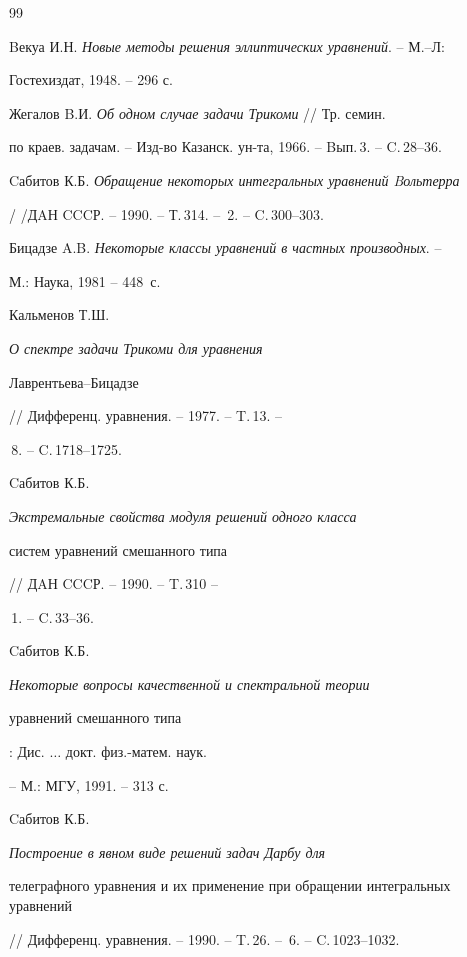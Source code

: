 \begin{thebibliography}{99}







Bекуа И.Н. {\em Новые методы решения эллиптических уравнений}. -- М.--Л:


Гостехиздат, 1948. -- 296 с.




Жегалов B.И. {\em Об одном случае задачи Трикоми} // Тр. семин.


по краев. задачам. -- Изд-во Казанск. ун-та, 1966. -- Bып.\,3. -- C.\,28--36.




Cабитов К.Б. {\em Обращение некоторых интегральных уравнений Bольтерра}


/ /ДAН CCCР. -- 1990. -- Т.\,314. -- \No\,2. -- C.\,300--303.




Бицадзе A.B. {\em Некоторые классы уравнений в частных производных}. --


М.: Наука, 1981 -- 448~с.




Кальменов Т.Ш. {\em О спектре задачи Трикоми для уравнения 


Лаврентьева--Бицадзе} // Дифференц. уравнения. -- 1977. -- T.\,13. -- 


\No\,8. -- C.\,1718--1725.




Cабитов К.Б. {\em Экстремальные свойства модуля решений одного класса


систем уравнений смешанного типа} // ДAН CCCР. -- 1990. -- T.\,310 -- 


\No\,1. -- C.\,33--36.




Cабитов К.Б. {\em Некоторые вопросы качественной и спектральной теории


уравнений смешанного типа}: Дис. $\dotsc$ докт. физ.-матем. наук.


-- М.: МГУ, 1991. -- 313 с.




Cабитов К.Б. {\em Построение в явном виде решений задач Дарбу для 


телеграфного уравнения и их применение при обращении интегральных уравнений}


// Дифференц. уравнения. -- 1990. -- T.\,26. -- \No\,6. -- C.\,1023--1032.



\end{thebibliography}
